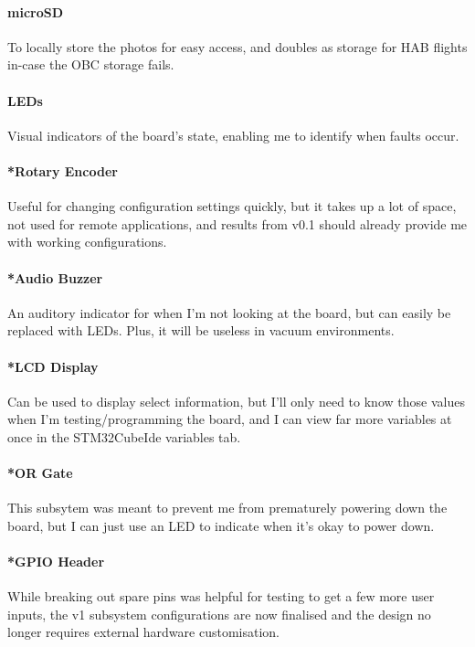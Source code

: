 \paragraph{microSD}
To locally store the photos for easy access, and doubles as storage for HAB flights in-case the OBC storage fails.

\paragraph{LEDs}
Visual indicators of the board's state, enabling me to identify when faults occur.

\paragraph{*Rotary Encoder}
Useful for changing configuration settings quickly, but it takes up a lot of space, not used for remote applications, and results from v0.1 should already provide me with working configurations.

\paragraph{*Audio Buzzer}
An auditory indicator for when I'm not looking at the board, but can easily be replaced with LEDs. Plus, it will be useless in vacuum environments.

\paragraph{*LCD Display}
Can be used to display select information, but I'll only need to know those values when I'm testing/programming the board, and I can view far more variables at once in the STM32CubeIde variables tab.

\paragraph{*OR Gate}
This subsytem was meant to prevent me from prematurely powering down the board, but I can just use an LED to indicate when it's okay to power down.

\paragraph{*GPIO Header}
While breaking out spare pins was helpful for testing to get a few more user inputs, the v1 subsystem configurations are now finalised and the design no longer requires external hardware customisation.